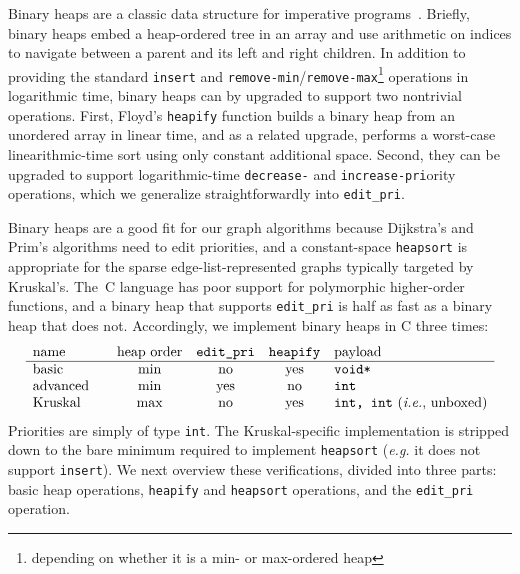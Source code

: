 \lstset{style=myTinyStyle}

Binary heaps are a classic data structure for imperative programs~\cite{clrs,sedgewick}.  Briefly, binary heaps embed a heap-ordered tree in an array and use arithmetic on indices to navigate between a parent and its left and right children.  In addition to providing the standard \texttt{insert} and \texttt{remove-min}/\texttt{remove-max}\footnote{depending on whether it is a min- or max-ordered heap} operations in logarithmic time, binary heaps can by upgraded to support two nontrivial operations.  First, Floyd's \texttt{heapify} function builds a binary heap from an unordered array in linear time, and as a related upgrade, performs a worst-case linearithmic-time sort using only constant additional space.  Second, they can be upgraded to support logarithmic-time \texttt{decrease-} and \texttt{increase-pri}ority operations, which we generalize straightforwardly into \texttt{edit\_pri}.

Binary heaps are a good fit for our graph algorithms because Dijkstra's and Prim's algorithms need to edit priorities, and a constant-space \texttt{heapsort} is appropriate for the sparse edge-list-represented graphs typically targeted by Kruskal's.  The~C language has poor support for polymorphic higher-order functions, and a binary heap that supports \texttt{edit\_pri} is half as fast as a binary heap that does not.  Accordingly, we implement binary heaps in C three times:
\[
\begin{array}{l@{\qquad}c@{\quad}c@{\quad}c@{\quad}l}
\text{name} & \text{heap order} & \texttt{edit\_pri} & \texttt{heapify} & \text{payload} \\
\hline
\text{basic} & \text{min} & \text{no} & \text{yes} & \texttt{void*} \\
\text{advanced} & \text{min} & \text{yes} & \text{no} & \texttt{int} \\
\text{Kruskal} & \text{max} & \text{no} & \text{yes} & \texttt{int, int} \text{ (\emph{i.e.}, unboxed)}
\end{array}
\]
Priorities are simply of type \texttt{int}.    The Kruskal-specific implementation is stripped down to the bare minimum required to implement \texttt{heapsort} (\emph{e.g.} it does not support \texttt{insert}).  We next overview these verifications, divided into three parts: basic heap operations, \texttt{heapify} and \texttt{heapsort} operations, and the \texttt{edit\_pri} operation.

